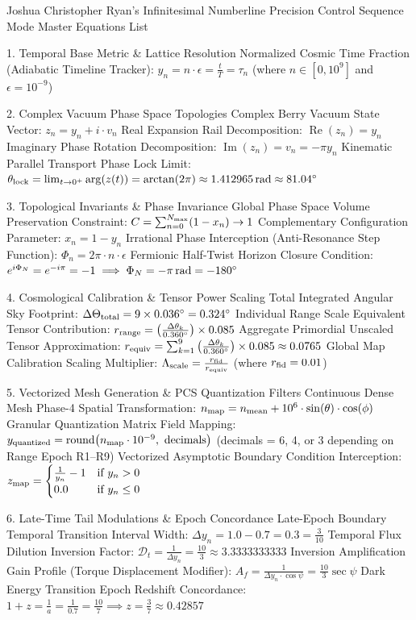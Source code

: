 Joshua Christopher Ryan's Infinitesimal Numberline Precision Control Sequence Mode Master Equations List

1. Temporal Base Metric & Lattice Resolution
Normalized Cosmic Time Fraction (Adiabatic Timeline Tracker):  
  \( y_n = n \cdot \epsilon = \frac{t}{T} = \tau_n \)  
  (where \( n \in [0, 10^9] \) and \( \epsilon = 10^{-9} \))

2. Complex Vacuum Phase Space Topologies
Complex Berry Vacuum State Vector:  
  \( z_n = y_n + i \cdot v_n \)
Real Expansion Rail Decomposition:  
  \( \operatorname{Re}(z_n) = y_n \)
Imaginary Phase Rotation Decomposition:  
  \( \operatorname{Im}(z_n) = v_n = -\pi y_n \)
Kinematic Parallel Transport Phase Lock Limit:  
  \( \theta_{\rm lock} = \lim_{t \to 0^+} \arg(z(t)) = \arctan(2\pi) \approx 1.412965\,{\rm rad} \approx 81.04^\circ \)

3. Topological Invariants & Phase Invariance
Global Phase Space Volume Preservation Constraint:  
  \( C = \sum_{n=0}^{N_{\rm max}} (1 - x_n) \to 1 \)
Complementary Configuration Parameter:  
  \( x_n = 1 - y_n \)
Irrational Phase Interception (Anti-Resonance Step Function):  
  \( \Phi_n = 2\pi \cdot n \cdot \epsilon \)
Fermionic Half-Twist Horizon Closure Condition:  
  \( e^{i\Phi_N} = e^{-i\pi} = -1 \implies \Phi_N = -\pi\,{\rm rad} = -180^\circ \)

4. Cosmological Calibration & Tensor Power Scaling
Total Integrated Angular Sky Footprint:  
  \( \Delta\Theta_{\rm total} = 9 \times 0.036^\circ = 0.324^\circ \)
Individual Range Scale Equivalent Tensor Contribution:  
  \( r_{\rm range} = \left( \frac{\Delta\theta_k}{0.360^\circ} \right) \times 0.085 \)
Aggregate Primordial Unscaled Tensor Approximation:  
  \( r_{\rm equiv} = \sum_{k=1}^{9} \left( \frac{\Delta\theta_k}{0.360^\circ} \right) \times 0.085 \approx 0.0765 \)
Global Map Calibration Scaling Multiplier:  
  \( \Lambda_{\rm scale} = \frac{r_{\rm fid}}{r_{\rm equiv}} \)  
  (where \( r_{\rm fid} = 0.01 \))

5. Vectorized Mesh Generation & PCS Quantization Filters
Continuous Dense Mesh Phase-4 Spatial Transformation:  
  \( n_{\rm map} = n_{\rm mean} + 10^6 \cdot \sin(\theta) \cdot \cos(\phi) \)
Granular Quantization Matrix Field Mapping:  
  \( y_{\rm quantized} = {\rm round}\bigl(n_{\rm map} \cdot 10^{-9},\ {\rm decimals}\bigr) \)  
  (decimals = 6, 4, or 3 depending on Range Epoch R1–R9)
Vectorized Asymptotic Boundary Condition Interception:  
  \( z_{\rm map} = \begin{cases} \frac{1}{y_n}-1 & \text{if } y_n > 0 \\ 0.0 & \text{if } y_n \le 0 \end{cases} \)

6. Late-Time Tail Modulations & Epoch Concordance
Late-Epoch Boundary Temporal Transition Interval Width:  
  \( \Delta y_n = 1.0 - 0.7 = 0.3 = \frac{3}{10} \)
Temporal Flux Dilution Inversion Factor:  
  \( \mathcal{D}_t = \frac{1}{\Delta y_n} = \frac{10}{3} \approx 3.3333333333 \)
Inversion Amplification Gain Profile (Torque Displacement Modifier):  
  \( A_f = \frac{1}{\Delta y_n \cdot \cos\psi} = \frac{10}{3}\sec\psi \)
Dark Energy Transition Epoch Redshift Concordance:  
  \( 1 + z = \frac{1}{a} = \frac{1}{0.7} = \frac{10}{7} \implies z = \frac{3}{7} \approx 0.42857 \)
